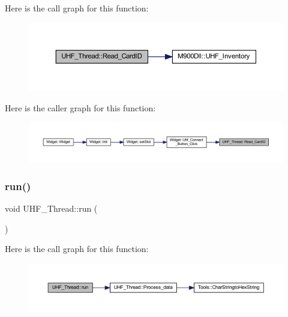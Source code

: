 Here is the call graph for this function\+:
\nopagebreak
\begin{figure}[H]
\begin{center}
\leavevmode
\includegraphics[width=350pt]{class_u_h_f___thread_a5c1a49f76f8e3a29fb009b7d638e5488_cgraph}
\end{center}
\end{figure}
Here is the caller graph for this function\+:
\nopagebreak
\begin{figure}[H]
\begin{center}
\leavevmode
\includegraphics[width=350pt]{class_u_h_f___thread_a5c1a49f76f8e3a29fb009b7d638e5488_icgraph}
\end{center}
\end{figure}
\mbox{\label{class_u_h_f___thread_a7ae2a5c0bae9b20e0fbc315febefb818}} 
\subsubsection{\texorpdfstring{run()}{run()}}
{\footnotesize\ttfamily void U\+H\+F\+\_\+\+Thread\+::run (\begin{DoxyParamCaption}{ }\end{DoxyParamCaption})\hspace{0.3cm}{\ttfamily [protected]}}

Here is the call graph for this function\+:
\nopagebreak
\begin{figure}[H]
\begin{center}
\leavevmode
\includegraphics[width=350pt]{class_u_h_f___thread_a7ae2a5c0bae9b20e0fbc315febefb818_cgraph}
\end{center}
\end{figure}
\mbox{\label{class_u_h_f___thread_a8a872370902a9eb489a836ab28d8044c}} 
